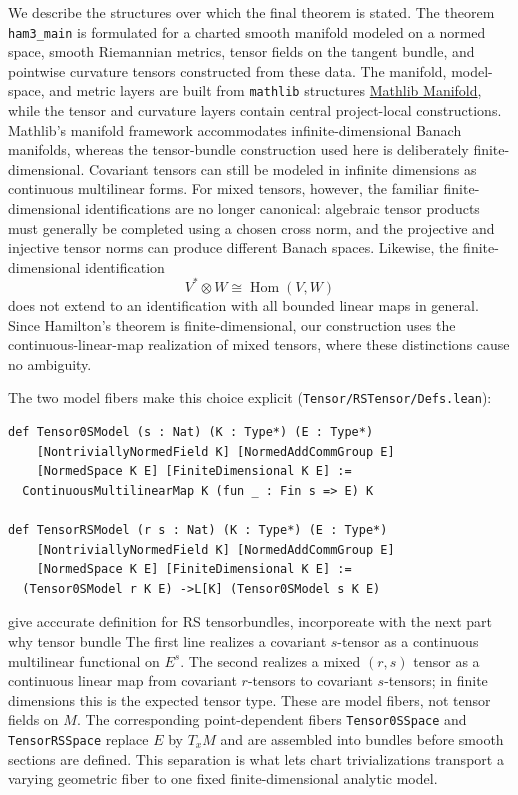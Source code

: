 \documentclass[11pt]{article}
\theoremstyle{plain}
\theoremstyle{definition}
\theoremstyle{remark}
\newcommand{\leanref}[1]{\nolinkurl{#1}}
\newcommand{\leanfile}[1]{\nolinkurl{#1}}
\newcommand{\rffile}[1]{\leanfile{#1}}
\begin{document}
We describe the structures over
which the final theorem is stated.  
The theorem \leanref{ham3_main} is
formulated for a charted smooth manifold modeled on a normed space, smooth
Riemannian metrics, tensor fields on the tangent bundle, and pointwise
curvature tensors constructed from these data.  The manifold, model-space,
and metric layers are built from \texttt{mathlib} structures
\href{https://leanprover-community.github.io/mathlib4_docs/Mathlib/Geometry/Manifold/IsManifold/Basic.html}{Mathlib Manifold},
while the tensor and curvature layers contain central project-local
constructions.  Mathlib's manifold framework accommodates infinite-dimensional
Banach manifolds, whereas the tensor-bundle construction used here is
deliberately finite-dimensional.  Covariant tensors can still be modeled in
infinite dimensions as continuous multilinear forms.  For mixed tensors,
however, the familiar finite-dimensional identifications are no longer
canonical: algebraic tensor products must generally be completed using a
chosen cross norm, and the projective and injective tensor norms can produce
different Banach spaces.  Likewise, the finite-dimensional identification
\[
V^*\otimes W \cong \operatorname{Hom}(V,W)
\]
does not extend to an identification with all bounded linear maps in general.
Since Hamilton's theorem is finite-dimensional, our construction uses the
continuous-linear-map realization of mixed tensors, where these distinctions
cause no ambiguity.

The two model fibers make this choice explicit
(\rffile{Tensor/RSTensor/Defs.lean}):

\begin{Verbatim}[breaklines=true,breakanywhere=true,fontsize=\small]
def Tensor0SModel (s : Nat) (K : Type*) (E : Type*)
    [NontriviallyNormedField K] [NormedAddCommGroup E]
    [NormedSpace K E] [FiniteDimensional K E] :=
  ContinuousMultilinearMap K (fun _ : Fin s => E) K

def TensorRSModel (r s : Nat) (K : Type*) (E : Type*)
    [NontriviallyNormedField K] [NormedAddCommGroup E]
    [NormedSpace K E] [FiniteDimensional K E] :=
  (Tensor0SModel r K E) ->L[K] (Tensor0SModel s K E)
\end{Verbatim}

{\color{red} give acccurate definition for RS tensorbundles, incorporeate with the next part why tensor bundle}
The first line realizes a covariant $s$-tensor as a continuous multilinear
functional on $E^s$.  The second realizes a mixed $(r,s)$ tensor as a
continuous linear map from covariant $r$-tensors to covariant $s$-tensors; in
finite dimensions this is the expected tensor type.  These are model fibers,
not tensor fields on $M$.  The corresponding point-dependent fibers
\leanref{Tensor0SSpace} and \leanref{TensorRSSpace} replace $E$ by $T_xM$ and
are assembled into bundles before smooth sections are defined.
This separation is what lets chart trivializations transport a varying geometric fiber to one fixed finite-dimensional analytic model.
\end{document}
